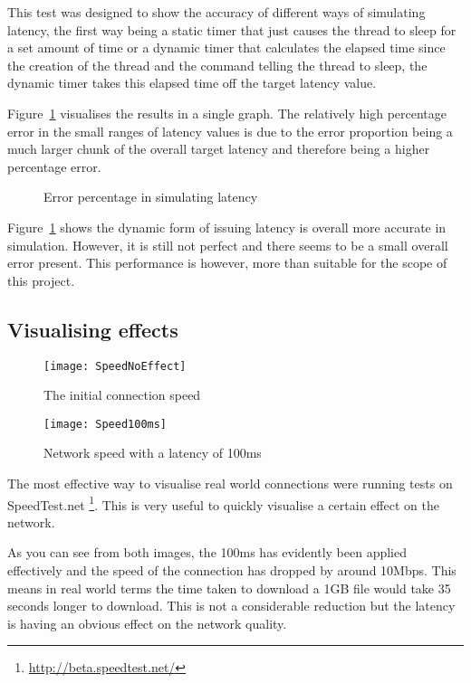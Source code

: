 This test was designed to show the accuracy of different ways of simulating latency, the first way being a static timer that just causes the thread to sleep for a set amount of time or a dynamic timer that calculates the elapsed time since the creation of the thread and the command telling the thread to sleep, the dynamic timer takes this elapsed time off the target latency value.

Figure~\ref{ref:latencyAccuracy} visualises the results in a single graph. The relatively high percentage error in the small ranges of latency values is due to the error proportion being a much larger chunk of the overall target latency and therefore being a higher percentage error.

\begin{center}
	
	\begin{figure}[h]
		\caption{Error percentage in simulating latency}
		\label{ref:latencyAccuracy}
	\end{figure}
\end{center}


Figure~\ref{ref:latencyAccuracy} shows the dynamic form of issuing latency is overall more accurate in simulation. However, it is still not perfect and there seems to be a small overall error present. This performance is however, more than suitable for the scope of this project.

\subsection{Visualising effects}
\begin{wrapfigure}{r}{5cm}
\begin{center}
	\texttt{[image: SpeedNoEffect]}
	\caption{The initial connection speed}
	\texttt{[image: Speed100ms]}
	\caption{Network speed with a latency of 100ms}
\end{center}
\end{wrapfigure}

The most effective way to visualise real world connections were running tests on SpeedTest.net \footnote{\url{http://beta.speedtest.net/}}. This is very useful to quickly visualise a certain effect on the network.

As you can see from both images, the 100ms has evidently been applied effectively and the speed of the connection has dropped by around 10Mbps. This means in real world terms the time taken to download a 1GB file would take 35 seconds longer to download. This is not a considerable reduction but the latency is having an obvious effect on the network quality.


